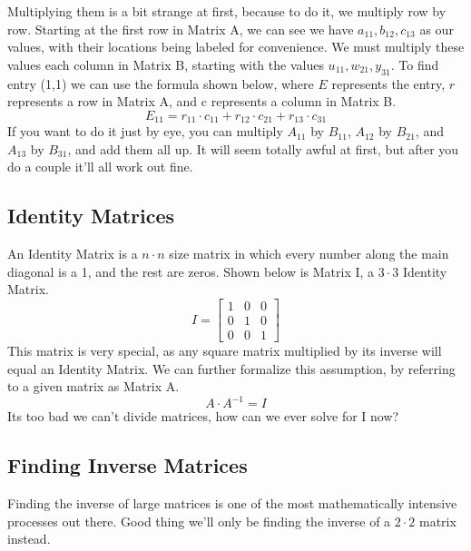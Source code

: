 \documentclass[final,1p,12pt]{elsarticle}
\begin{document}
        Multiplying them is a bit strange at first, because to do it, we multiply row by row.
        Starting at the first row in Matrix A, we can see we have $a_{11},b_{12},c_{13}$ as our values, with their locations being labeled for convenience.
        We must multiply these values each column in Matrix B, starting with the values $u_{11},w_{21},y_{31}$.
        To find entry (1,1) we can use the formula shown below, where $E$ represents the entry, $r$ represents a row in Matrix A, and c represents a column in Matrix B.
        \begin{equation*}
            E_{11} = r_{11} \cdot c_{11}  +  r_{12} \cdot c_{21}  +   r_{13} \cdot c_{31}
        \end{equation*}
        If you want to do it just by eye, you can multiply $A_{11}$ by $B_{11}$, $A_{12}$ by $B_{21}$, and $A_{13}$ by $B_{31}$, and add them all up.
        It will seem totally awful at first, but after you do a couple it'll all work out fine.
        
        \subsection{Identity Matrices}
        An Identity Matrix is a $n\cdot n$ size matrix in which every number along the main diagonal is a 1, and the rest are zeros.
        Shown below is Matrix I, a $3\cdot 3$ Identity Matrix.
        \begin{equation*}
        I =
            \begin{bmatrix}
                1 & 0 & 0\\
                0 & 1 & 0\\
                0 & 0 & 1
            \end{bmatrix}
        \end{equation*}
        This matrix is very special, as any square matrix multiplied by its inverse will equal an Identity Matrix.
        We can further formalize this assumption, by referring to a given matrix as Matrix A.
        \begin{equation*}
            A\cdot A^{-1} = I
        \end{equation*}
        Its too bad we can't divide matrices, how can we ever solve for I now?
        
        \subsection{Finding Inverse Matrices}
        Finding the inverse of large matrices is one of the most mathematically intensive processes out there.
        Good thing we'll only be finding the inverse of a $2\cdot2$ matrix instead.
\end{document}
